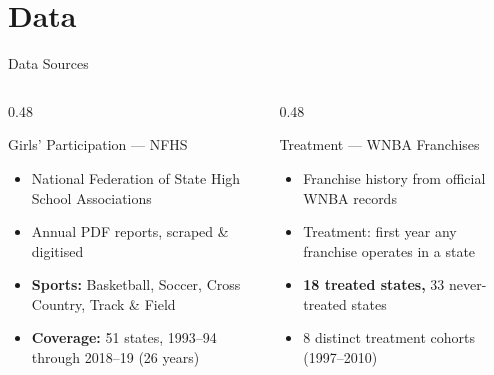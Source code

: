 \documentclass[aspectratio=169, 12pt]{beamer}
\begin{document}
\section{Data}

\begin{frame}{Data Sources}
  \begin{columns}[T]
    \begin{column}{0.48\textwidth}
      \begin{block}{Girls' Participation — NFHS}
        \begin{itemize}\small
          \item National Federation of State High School Associations
          \item Annual PDF reports, scraped \& digitised
          \item \textbf{Sports:} Basketball, Soccer, Cross Country, Track \& Field
          \item \textbf{Coverage:} 51 states, 1993--94 through 2018--19 (26 years)
        \end{itemize}
      \end{block}
    \end{column}
    \begin{column}{0.48\textwidth}
      \begin{block}{Treatment — WNBA Franchises}
        \begin{itemize}\small
          \item Franchise history from official WNBA records
          \item Treatment: first year any franchise operates in a state
          \item \textbf{18 treated states,} 33 never-treated states
          \item 8 distinct treatment cohorts (1997--2010)
        \end{itemize}
      \end{block}
    \end{column}
  \end{columns}
\end{frame}
\end{document}
